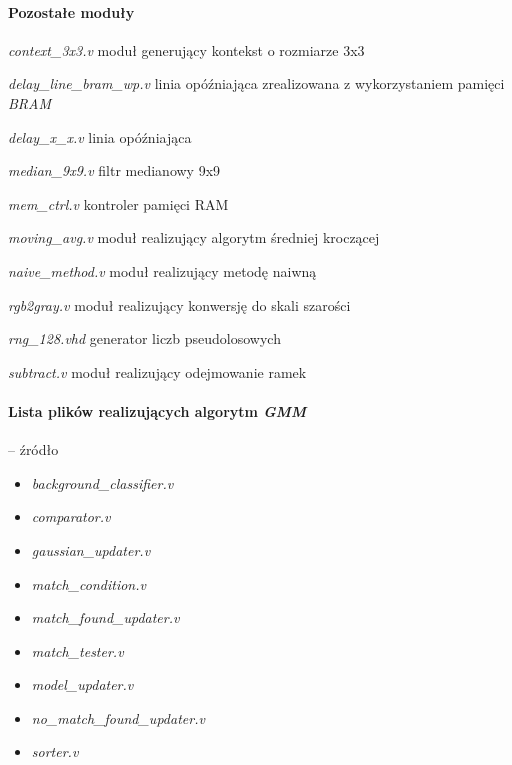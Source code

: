 \paragraph*{Pozostałe moduły}
\begin{eqwhere}[4.5cm]
    \item[\textit{context\_3x3.v}] moduł generujący kontekst o rozmiarze 3x3
	\item[\textit{delay\_line\_bram\_wp.v}] linia opóźniająca zrealizowana z wykorzystaniem pamięci \textit{BRAM}	
	\item[\textit{delay\_x\_x.v}] linia opóźniająca
	\item[\textit{median\_9x9.v}] filtr medianowy 9x9
	\item[\textit{mem\_ctrl.v}] kontroler pamięci RAM
	\item[\textit{moving\_avg.v}] moduł realizujący algorytm średniej kroczącej
	\item[\textit{naive\_method.v}] moduł realizujący metodę naiwną
	\item[\textit{rgb2gray.v}] moduł realizujący konwersję do skali szarości
	\item[\textit{rng\_128.vhd}] generator liczb pseudolosowych
	\item[\textit{subtract.v}] moduł realizujący odejmowanie ramek
\end{eqwhere}

\paragraph*{Lista plików realizujących algorytm \textit{GMM}} -- źródło \cite{piszczek_15}
\begin{itemize}[noitemsep, topsep=0pt]
	\item \textit{background\_classifier.v}
	\item \textit{comparator.v}
	\item \textit{gaussian\_updater.v}
	\item \textit{match\_condition.v}
	\item \textit{match\_found\_updater.v}
	\item \textit{match\_tester.v}
	\item \textit{model\_updater.v}
	\item \textit{no\_match\_found\_updater.v}
	\item \textit{sorter.v}
\end{itemize}